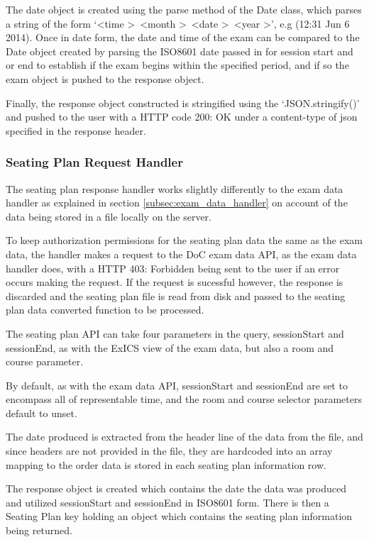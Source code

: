 The date object is created using the parse method of the Date class, which parses a string of the form `\textless time \textgreater \, \textless month \textgreater \, \textless date \textgreater \, \textless year \textgreater', e.g (12:31 Jun 6 2014).  Once in date form, the date and time of the exam can be compared to the Date object created by parsing the ISO8601 date passed in for session start and or end to establish if the exam begins within the specified period, and if so the exam object is pushed to the response object.

Finally, the response object constructed is stringified using the `JSON.stringify()' and pushed to the user with a HTTP code 200: OK under a content-type of json specified in the response header.

\FloatBarrier

\subsubsection{Seating Plan Request Handler}

The seating plan response handler works slightly differently to the exam data handler as explained in section \ref{subsec:exam_data_handler} on account of the data being stored in a file locally on the server.

To keep authorization permissions for the seating plan data the same as the exam data, the handler makes a request to the DoC exam data API, as the exam data handler does, with a HTTP 403: Forbidden being sent to the user if an error occurs making the request.  If the request is sucessful however, the response is discarded and the seating plan file is read from disk and passed to the seating plan data converted function to be processed.

The seating plan API can take four parameters in the query, sessionStart and sessionEnd, as with the ExICS view of the exam data, but also a room and course parameter.

By default, as with the exam data API, sessionStart and sessionEnd are set to encompass all of representable time, and the room and course selector parameters default to unset.

The date produced is extracted from the header line of the data from the file, and since headers are not provided in the file, they are hardcoded into an array mapping to the order data is stored in each seating plan information row.

The response object is created which contains the date the data was produced and utilized sessionStart and sessionEnd in ISO8601 form.  There is then a Seating Plan key holding an object which contains the seating plan information being returned.


